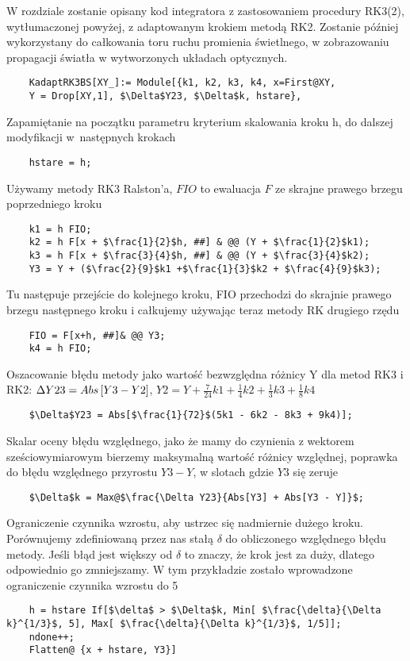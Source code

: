 \indent W rozdziale zostanie opisany kod integratora z zastosowaniem procedury RK3(2), wytłumaczonej powyżej, z adaptowanym krokiem metodą RK2. Zostanie później wykorzystany do całkowania toru ruchu promienia świetlnego, w  zobrazowaniu propagacji światła w wytworzonych układach optycznych.
\begin{lstlisting}
    KadaptRK3BS[XY_]:= Module[{k1, k2, k3, k4, x=First@XY, 
    Y = Drop[XY,1], $\Delta$Y23, $\Delta$k, hstare},
\end{lstlisting}
Zapamiętanie na początku parametru kryterium skalowania kroku h, do dalszej modyfikacji w~następnych krokach
\begin{lstlisting}
    hstare = h;
\end{lstlisting}
Używamy metody RK3 Ralston'a, $FIO$ to ewaluacja $F$ ze skrajne prawego brzegu poprzedniego kroku
\begin{lstlisting}
    k1 = h FIO;
    k2 = h F[x + $\frac{1}{2}$h, ##] & @@ (Y + $\frac{1}{2}$k1);
    k3 = h F[x + $\frac{3}{4}$h, ##] & @@ (Y + $\frac{3}{4}$k2);
    Y3 = Y + ($\frac{2}{9}$k1 +$\frac{1}{3}$k2 + $\frac{4}{9}$k3);
\end{lstlisting}
Tu następuje przejście do kolejnego kroku, FIO przechodzi do skrajnie prawego brzegu następnego kroku i całkujemy używając teraz metody RK drugiego rzędu
\begin{lstlisting}
    FIO = F[x+h, ##]& @@ Y3;
    k4 = h FIO;
\end{lstlisting}
Oszacowanie błędu metody jako wartość bezwzględna różnicy Y dla metod RK3 i RK2: $\Delta Y23 = Abs\left[{Y3-Y2}\right]$, $Y2=Y+\frac{7}{24}k1+\frac{1}{4}k2+\frac{1}{3}k3+\frac{1}{8}k4$
\begin{lstlisting}
    $\Delta$Y23 = Abs[$\frac{1}{72}$(5k1 - 6k2 - 8k3 + 9k4)];
\end{lstlisting}
Skalar oceny błędu względnego, jako że mamy do czynienia z wektorem sześciowymiarowym bierzemy maksymalną wartość różnicy względnej, poprawka do błędu względnego przyrostu $Y3-Y$, w slotach gdzie $Y3$ się zeruje
\begin{lstlisting}
    $\Delta$k = Max@$\frac{\Delta Y23}{Abs[Y3] + Abs[Y3 - Y]}$;
\end{lstlisting}
Ograniczenie czynnika wzrostu, aby ustrzec się nadmiernie dużego kroku. Porównujemy zdefiniowaną przez nas stałą $\delta$ do obliczonego względnego błędu metody. Jeśli błąd jest większy od $\delta$ to znaczy, że krok jest za duży, dlatego odpowiednio go zmniejszamy. W tym przykładzie zostało wprowadzone ograniczenie czynnika wzrostu do 5
\begin{lstlisting}
    h = hstare If[$\delta$ > $\Delta$k, Min[ $\frac{\delta}{\Delta k}^{1/3}$, 5], Max[ $\frac{\delta}{\Delta k}^{1/3}$, 1/5]];
    ndone++;
    Flatten@ {x + hstare, Y3}]
\end{lstlisting}
